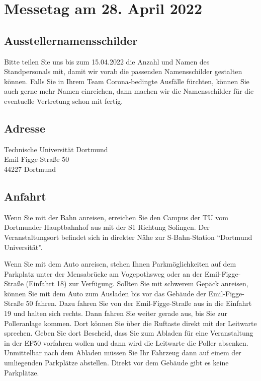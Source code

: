 \documentclass[
  paper=a4,
  fontsize=12pt,
  DIV=16,
  headheight=30pt,
  footheight=45pt,
  headinclude,
  parskip=half,
]{scrartcl}
\begin{document}
\section*{Messetag am 28. April 2022}

\subsection*{Ausstellernamensschilder}

Bitte teilen Sie uns bis zum 15.04.2022 die Anzahl und Namen des Standpersonals mit, damit wir vorab die passenden Namensschilder gestalten können.
Falls Sie in Ihrem Team Corona-bedingte Ausfälle fürchten, können Sie auch gerne mehr Namen einreichen, dann machen wir die Namensschilder für die eventuelle Vertretung schon mit fertig.

\subsection*{Adresse}

Technische Universität Dortmund\\
Emil-Figge-Straße 50\\
44227 Dortmund\\

\subsection*{Anfahrt}

Wenn Sie mit der Bahn anreisen, erreichen Sie den Campus der TU vom Dortmunder Hauptbahnhof aus mit der S1 Richtung Solingen.
Der Veranstaltungsort befindet sich in direkter Nähe zur S-Bahn-Station \enquote{Dortmund Universität}.

Wenn Sie mit dem Auto anreisen, stehen Ihnen Parkmöglichkeiten auf dem Parkplatz unter der Mensabrücke am Vogepothsweg oder an der Emil-Figge-Straße (Einfahrt 18) zur Verfügung.
Sollten Sie mit schwerem Gepäck anreisen, können Sie mit dem Auto zum Ausladen bis vor das Gebäude der Emil-Figge-Straße 50 fahren.
Dazu fahren Sie von der Emil-Figge-Straße aus in die Einfahrt 19 und halten sich rechts.
Dann fahren Sie weiter gerade aus, bis Sie zur Polleranlage kommen.
Dort können Sie über die Ruftaste direkt mit der Leitwarte sprechen.
Geben Sie dort Bescheid, dass Sie zum Abladen für eine Veranstaltung in der EF50 vorfahren wollen und dann wird die Leitwarte die Poller absenken.
Unmittelbar nach dem Abladen müssen Sie Ihr Fahrzeug dann auf einem der umliegenden Parkplätze abstellen.
Direkt vor dem Gebäude gibt es keine Parkplätze.
\end{document}
